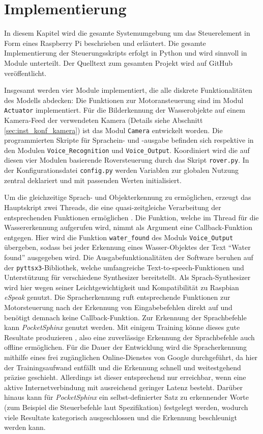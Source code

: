 \chapter{Implementierung}
\label{chp:implementierung}

In diesem Kapitel wird die gesamte Systemumgebung um das Steuerelement in Form eines Raspberry Pi beschrieben und erläutert.
Die gesamte Implementierung der Steuerungsskripts erfolgt in Python und wird sinnvoll in Module unterteilt.
Der Quelltext zum gesamten Projekt wird auf GitHub veröffentlicht.

Insgesamt werden vier Module implementiert, die alle diskrete Funktionalitäten des Modells abdecken: Die Funktionen zur Motoransteuerung sind im Modul \texttt{Actuator} implementiert. 
Für die Bilderkennung der Wasserobjekte auf einem Kamera-Feed der verwendeten Kamera (Details siehe Abschnitt \ref{sec:inst_konf_kamera}) ist das Modul \texttt{Camera} entwickelt worden.
Die programmierten Skripte für Sprachein- und -ausgabe befinden sich respektive in den Modulen \texttt{Voice\_Recognition} und \texttt{Voice\_Output}.
Koordiniert wird die auf diesen vier Modulen basierende Roversteuerung durch das Skript \texttt{rover.py}.
In der Konfigurationsdatei \texttt{config.py} werden Variablen zur globalen Nutzung zentral deklariert und mit passenden Werten initialisiert.

Um die gleichzeitige Sprach- und Objekterkennung zu ermöglichen, erzeugt das Hauptskript zwei Threads, die eine quasi-zeitgleiche Verarbeitung der entsprechenden Funktionen ermöglichen \cite{donat2018, yamanoor2017}.
Die Funktion, welche im Thread für die Wassererkennung aufgerufen wird, nimmt als Argument eine Callback-Funktion entgegen.
Hier wird die Funktion \texttt{water\_found} des Moduls \texttt{Voice\_Output} übergeben, sodass bei jeder Erkennung eines Wasser-Objektes der Text \enquote{Water found} ausgegeben wird.
Die Ausgabefunktionalitäten der Software beruhen auf der \texttt{pyttsx3}-Bibliothek, welche umfangreiche Text-to-speech-Funktionen und Unterstützung für verschiedene Synthesizer bereitstellt.
Als Sprach-Synthesizer wird hier wegen seiner Leichtgewichtigkeit und Kompatibilität zu Raspbian \textit{eSpeak} \cite{molloy2016} genutzt.
Die Spracherkennung ruft entsprechende Funktionen zur Motorsteuerung nach der Erkennung von Eingabebefehlen direkt auf und benötigt demnach keine Callback-Funktion.
Zur Erkennung der Sprachbefehle kann \textit{PocketSphinx} genutzt werden.
Mit einigem Training könne dieses gute Resultate produzieren \cite[vgl.][S. 644]{molloy2016}, also eine zuverlässige Erkennung der Sprachbefehle auch offline ermöglichen.
Für die Dauer der Entwicklung wird die Spracherkennung mithilfe eines frei zugänglichen Online-Dienstes von Google durchgeführt, da hier der Trainingsaufwand entfällt und die Erkennung schnell und weitestgehend präzise geschieht.
Allerdings ist dieser entsprechend nur erreichbar, wenn eine aktive Internetverbindung mit ausreichend geringer Latenz besteht.
Darüber hinaus kann für \textit{PocketSphinx} ein selbst-definierter Satz zu erkennender Worte (zum Beispiel die Steuerbefehle laut Spezifikation) festgelegt werden, wodurch viele Resultate kategorisch ausgeschlossen und die Erkennung beschleunigt werden kann.

